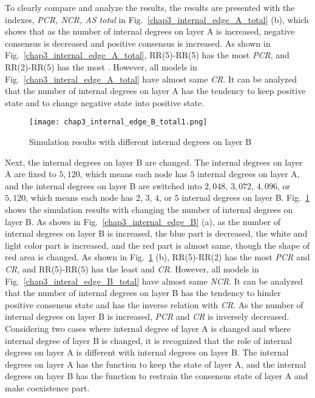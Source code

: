To clearly compare and analyze the results, the results are presented with the indexes, \textit{PCR, NCR, AS total} in Fig.~\ref{chap3_internal_edge_A_total} (b), which shows that as the number of internal degrees on layer A is increased, negative consensus is decreased and positive consensus is increased. As shown in Fig.~\ref{chap3_internal_edge_A_total}, RR(5)-RR(5) has the most \textit{PCR}, and RR(2)-RR(5) has the most . However, all models in Fig.~\ref{chap3_interal_edge_A_total} have almost same \textit{CR}. It can be analyzed that the number of internal degrees on layer A has the tendency to keep positive state and to change negative state into positive state. 
\begin{figure}[!htb]
	\centering
	\texttt{[image: chap3\_internal\_edge\_B\_total1.png]}
	\caption{Simulation results with different internal degrees on layer B}
	\label{chap3_internal_edge_B_total}
\end{figure}
Next, the internal degrees on layer B are changed. The internal degrees on layer A are fixed to  $5,120$, which means each node has $5$ internal degrees on layer A, and the internal degrees on layer B are switched into $2,048$, $3,072$, $4,096$, or $5,120$, which means each node has $2$, $3$, $4$, or $5$ internal degrees on layer B.  
Fig.~\ref{chap3_internal_edge_B_total} shows the simulation results with changing the number of internal degrees on layer B. As shows in Fig.~\ref{chap3_internal_edge_B} (a), as the number of internal degrees on layer B is increased, the blue part is decreased, the white and light color part is increased, and the red part is almost same, though the shape of red area is changed.  As shown in Fig.~\ref{chap3_internal_edge_B_total} (b), RR(5)-RR(2) has the most \textit{PCR} and \textit{CR}, and RR(5)-RR(5) has the least  and \textit{CR}. However, all models in Fig.~\ref{chap3_interal_edge_B_total} have almost same \textit{NCR}. It can be analyzed that the number of internal degrees on layer B has the tendency to hinder positive consensus state and has the inverse relation with \textit{CR}. As the number of internal degrees on layer B is increased, \textit{PCR} and \textit{CR} is inversely decreased.\\ 
Considering two cases where internal degree of layer A is changed and where internal degree of layer B is changed, it is recognized that the role of internal degrees on layer A is different with internal degrees on layer B. The internal degrees on layer A has the function to keep the state of layer A, and the internal degrees on layer B has the function to restrain the consensus state of layer A and make coexistence part. 
